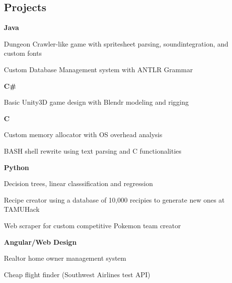 \documentclass[10pt,letterpaper]{article}
\newenvironment{indentsection}[1]%
{\begin{list}{}%
	{\setlength{\leftmargin}{#1}}%
	\item[]%
}
{\end{list}}
\newcommand{\CPP}
{C\nolinebreak[4]\hspace{-.05em}\raisebox{.22ex}{\footnotesize\bf ++}}
\begin{document}
	\subsection*{Projects}
	\begin{indentsection}{\parindent}
		\begin{itemize*}
		\item \textbf{Java} 
		\vspace{-0.2em}
			\begin{itemize*}
				\item Dungeon Crawler-like game with spritesheet parsing, soundintegration, and custom fonts 
				\item Custom Database Management system with ANTLR Grammar
			\end{itemize*}
		\item \textbf{C\#} 
		\vspace{-0.2em}
			\begin{itemize*}
				\item Basic Unity3D game design with Blendr modeling and rigging 
			\end{itemize*}
		\item \textbf{\CPP}
		\vspace{-0.2em}
			\begin{itemize*}
				\item Custom memory allocator with OS overhead analysis
				\item BASH shell rewrite using text parsing and C functionalities 
			\end{itemize*}
		\item \textbf{Python}
		\vspace{-0.2em}
			\begin{itemize*}
				\item Decision trees, linear classsification and regression 
				\item Recipe creator using a database of 10,000 recipies to generate new ones at TAMUHack 
				\item Web scraper for custom competitive Pokemon team creator
		\end{itemize*}
		\item \textbf{Angular/Web Design}
		\vspace{-0.2em}
			\begin{itemize*}
				\item Realtor home owner management system
				\item Cheap flight finder (Southwest Airlines test API)
			\end{itemize*}
		\end{itemize*}
	\end{indentsection}
\fi
\end{document}
